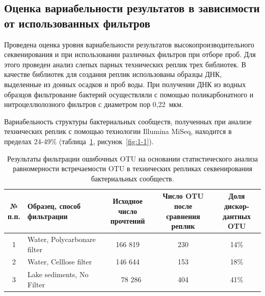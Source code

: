 \documentclass[a4paper,12pt,openany,final]{extreport}
\newcommand\MA[2]{{\sffamily\color{red}\hsmash{$\uparrow$}%
  \smash{\toplap{#1}{\scriptsize\bfseries #2}}}}
\def\oldcaption{} \let\oldcaption=\caption
\def\caption{\stepcounter{captionsnum}\oldcaption}
\newcommand\T{\rule{0pt}{2.6ex}}       %
\renewcommand\MA[2]{}
\begin{document}
\subsection{Оценка вариабельности результатов в зависимости от использованных фильтров}

Проведена оценка уровня вариабельности результатов высокопроизводительного секвенирования и при использовании различных фильтров при отборе проб. Для этого проведен анализ слепых парных технических реплик трех библиотек. В качестве библиотек для создания реплик использованы образцы ДНК, выделенные из донных осадков и проб воды. При получении ДНК из водных образцов фильтрование бактерий осуществляли с помощью поликарбонатного и нитроцеллюлозного фильтров с диаметром пор 0,22~мкм\MA{l}{указать каких именно проб}.

Вариабельность структуры бактериальных сообществ, полученных при анализе технических реплик с помощью технологии Illumina MiSeq, находится в пределах 24-49\% (таблица~\ref{table:1-1}, рисунок~\ref{fig:1-1})\MA{r}{Это много -- или допустимо ?}.

\begin{table}
\caption{Результаты фильтрации ошибочных OTU на основании
статистического анализа равномерности встречаемости OTU в технических
репликах секвенирования бактериальных сообществ\protect\MA{r}{По-русски, и указать, какие именно это пробы}.
}\label{table:1-1}
\vspace{1em}
\centering

{\small%
  \begin{tabular}[]{|c|l|c|c|c|}
\hline
\makecell{\T №\\п.п.} &\makecell[cc]{Образец, способ\\ фильтрации}&\makecell[cc]{Исходное число\\ прочтений}&\makecell[cc]{Число OTU после\\ сравнения реплик}& \makecell[cc]{Доля дискор-\\дантных OTU}\\\hline
1 &\T Water, Polycarbonare filter & 166 819 & 230 & 14\% \\
2 & Water, Celllose filter & 146 644 & 153 & 18\%\\
3 & Lake sediments, No Filter & \ \ 78 286 & 404 & 41\%\\\hline
  \end{tabular}}
\end{table}
\end{document}
